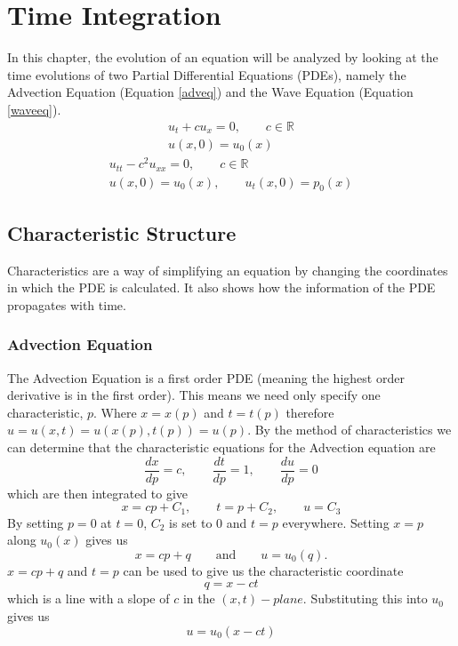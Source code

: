\chapter{Time Integration}
In this chapter, the evolution of an equation will be analyzed by looking at the time evolutions of two Partial Differential Equations (PDEs), namely the Advection Equation (Equation \ref{adveq}) and the Wave Equation (Equation \ref{waveeq}).
\begin{gather} \label{adveq}
  u_t + cu_x = 0, \qquad c \in \mathbb{R} \\ \nonumber
  u(x,0) = u_0(x)
\end{gather}
\begin{gather} \label{waveeq}
  u_{tt} - c^2u_{xx} = 0, \qquad c \in \mathbb{R} \\ \nonumber
  u(x,0) = u_0(x), \qquad u_t(x,0) = p_0(x)
\end{gather}
\section{Characteristic Structure}
Characteristics are a way of simplifying an equation by changing the coordinates in which the PDE is calculated. It also shows how the information of the PDE propagates with time.
\subsection{Advection Equation}
The Advection Equation is a first order PDE (meaning the highest order derivative is in the first order). This means we need only specify one characteristic, $p$. Where $x = x(p)$ and $t = t(p)$ therefore $u = u(x,t) = u(x(p),t(p)) = u(p)$.
\linebreak
\linebreak
By the method of characteristics we can determine that the characteristic equations for the Advection equation are
\begin{equation}
\frac{dx}{dp} = c, \qquad \frac{dt}{dp} = 1, \qquad \frac{du}{dp} = 0
\end{equation}
which are then integrated to give
\begin{equation}
  x = cp + C_1, \qquad t = p + C_2, \qquad u = C_3
\end{equation}
By setting $p=0$ at $t=0$, $C_2$ is set to 0 and $t=p$ everywhere. Setting $x=p$ along $u_0(x)$ gives us
\begin{equation}
x=cp+q \qquad \text{and} \qquad u=u_0(q).
\end{equation}
\linebreak
\linebreak
$x=cp+q$ and $t=p$ can be used to give us the characteristic coordinate
\begin{equation}
q=x-ct
\end{equation}
which is a line with a slope of $c$ in the $(x,t)-plane$. Substituting this into $u_0$ gives us
\begin{equation}
  u = u_0(x - ct)
\end{equation}
